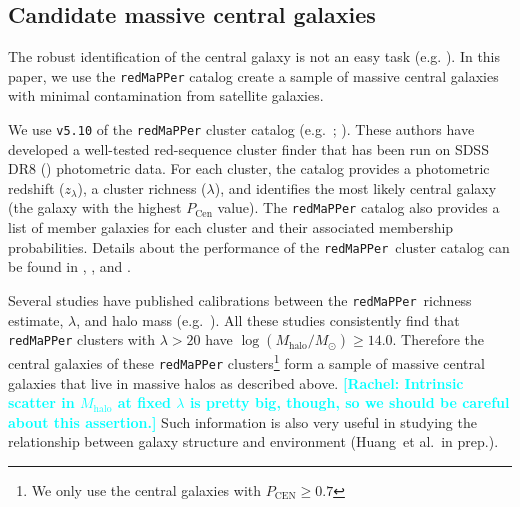 \documentclass[a4paper,fleqn,usenatbib]{mnras}
\def\etal{{\ et al.~}}
\def\redm{\texttt{redMaPPer}}
\def\mstar{{$M_{\star}$}}
\def\mhalo{{$M_{\mathrm{halo}}$}}
\def\logmtot{{$\log (M_{\star,100\mathrm{kpc}}/M_{\odot})$}}
\newcommand{\rachel}[1]{\textcolor{cyan}{\textbf{[Rachel: #1]}}}
\begin{document}
\subsection{Candidate massive central galaxies}
    \label{ssec:redmapper}
    
    The robust identification of the central galaxy is not an easy task (e.g.
    \citealt{Yang2007}). 
    In this paper, we use the \redm{} catalog create a sample of massive central 
    galaxies with minimal contamination from satellite galaxies.

    
    We use \texttt{v5.10} of the \redm{} cluster  catalog
    (e.g.\ \citealt{Rykoff2014}; \citealt{Rozo2015b}). 
    These authors have developed a well-tested red-sequence cluster finder that has 
    been run on SDSS DR8 (\citealt{SDSSDR8}) photometric data. 
    For each cluster, the catalog provides a photometric redshift ($z_{\lambda}$), a 
    cluster richness ($\lambda$), and identifies the most likely central galaxy (the 
    galaxy with the highest $P_{\mathrm{Cen}}$ value). 
    The \redm{}{} catalog also provides a list of member galaxies for each cluster and 
    their associated membership probabilities. 
    Details about the performance of the \redm{}~cluster catalog can be found in 
    \citet{Rozo2014}, \citet{Rozo2015a}, and \citet{Rozo2015b}. 
    
    Several studies have published calibrations between the \redm{}~richness estimate, 
    $\lambda$, and halo mass (e.g.\ \citealt{Saro2015, Farahi2016, Simet2016, 
    Melchior2016}). 
    All these studies consistently find that \redm{} clusters with $\lambda > 20$ 
    have $\log (M_{\mathrm{halo}}/M_{\odot}) \geq 14.0$. 
    Therefore the central galaxies of these \redm{} clusters\footnote{We only use the 
    central galaxies with $P_{\mathrm{CEN}} \geq 0.7$} form a sample of massive central 
    galaxies that live in massive halos as described above.
\rachel{Intrinsic scatter in \mhalo{} at fixed $\lambda$ is pretty big, though, so we should be careful about this assertion.}
Such information is also very useful in studying the relationship between galaxy
    structure and environment (Huang\etal in prep.).
\end{document}
